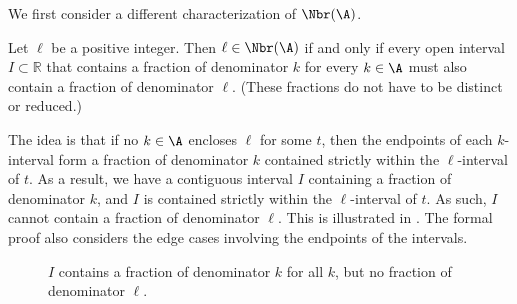 We first consider a different characterization of $\Nbr(\A)$.

\begin{claim}
    \label{claim:intervalcondition}
    Let $\ell$ be a positive integer. Then $\ell\in \Nbr(\A)$ if and only if every open interval $I\subset \mathbb{R}$ that contains a fraction of denominator $k$ for every $k\in \A$ must also contain a fraction of denominator $\ell$. (These fractions do not have to be distinct or reduced.)
\end{claim}

The idea is that if no $k\in \A$ encloses $\ell$ for some $t$, then the endpoints of each $k$-interval form a fraction of denominator $k$ contained strictly within the $\ell$-interval of $t$. As a result, we have a contiguous interval $I$ containing a fraction of denominator $k$, and $I$ is contained strictly within the $\ell$-interval of $t$. As such, $I$ cannot contain a fraction of denominator $\ell$. This is illustrated in . The formal proof also considers the edge cases involving the endpoints of the intervals.

\begin{figure}[ht]
    \centering
    \caption{$I$ contains a fraction of denominator $k$ for all $k$, but no fraction of denominator $\ell$.}
    \label{fig:intervalcondition}
\end{figure}


